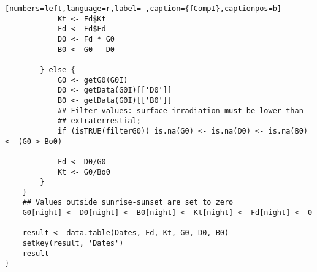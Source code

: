 \begin{lstlisting}[numbers=left,language=r,label= ,caption={fCompI},captionpos=b]
            Kt <- Fd$Kt
            Fd <- Fd$Fd
            D0 <- Fd * G0
            B0 <- G0 - D0

        } else { 
            G0 <- getG0(G0I)
            D0 <- getData(G0I)[['D0']]
            B0 <- getData(G0I)[['B0']]
            ## Filter values: surface irradiation must be lower than
            ## extraterrestial; 
            if (isTRUE(filterG0)) is.na(G0) <- is.na(D0) <- is.na(B0) <- (G0 > Bo0)

            Fd <- D0/G0
            Kt <- G0/Bo0
        }
    }
    ## Values outside sunrise-sunset are set to zero
    G0[night] <- D0[night] <- B0[night] <- Kt[night] <- Fd[night] <- 0

    result <- data.table(Dates, Fd, Kt, G0, D0, B0)
    setkey(result, 'Dates')
    result
}
\end{lstlisting}
